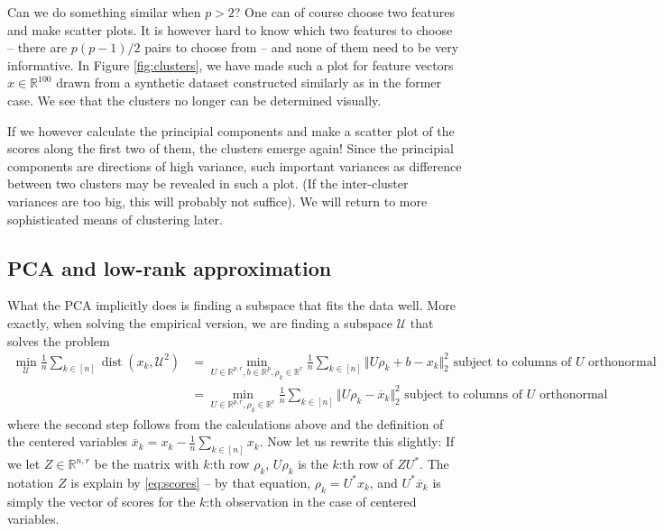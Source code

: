 \documentclass{article}
\newcommand{\calU}{\mathcal{U}}
\newcommand{\R}{\mathbb{R}}
\newcommand{\norm}[1]{\Vert #1 \Vert}
\DeclareMathOperator{\dist}{dist}
\begin{document}
Can we do something similar when $p>2$? One can of course choose two features and make scatter plots. It is however hard to know which two features to choose -- there are $p(p-1)/2$ pairs to choose from -- and none of them need to be very informative. In Figure \ref{fig:clusters}, we have made such a plot for feature vectors $x\in \R^{100}$ drawn from a synthetic dataset constructed similarly as in the former case. We see that the clusters no longer can be determined visually. 

If we however calculate the principial components and make a scatter plot of the scores along the first two of them, the clusters emerge again! Since the principial components are directions of high variance, such important variances as difference between two clusters may be revealed in such a plot. (If the inter-cluster variances are too big, this will probably not suffice). We will return to more sophisticated means of clustering later.

\subsection{PCA and low-rank approximation}
 What the PCA implicitly does is finding a subspace that fits the data well. More exactly, when solving the empirical version, we are finding a subspace $\calU$ that solves the problem
 \begin{align*}
     \min_{\calU} \frac{1}{n}\sum_{k \in [n]} \dist(x_k,\calU^2) &= \min_{U\in \R^{p,r},b \in \R^p,\rho_k \in \R^r} \frac{1}{n} \sum_{k \in [n]} \norm{U\rho_k+b-x_k}^2_2 \text{ subject to columns of } U \text{ orthonormal} \\
     &= \min_{U\in \R^{p,r},\rho_k\in \R^r} \frac{1}{n} \sum_{k \in [n]} \norm{U\rho_k- \overline{x}_k}^2_2 \text{ subject to columns of } U \text{ orthonormal}
 \end{align*}
 where the second step follows from the calculations above and the definition of the centered variables $\overline{x}_k = x_k - \tfrac{1}{n}\sum_{k\in [n]} x_k$. Now let us rewrite this slightly: If we let $Z \in \R^{n,r}$ be the matrix with $k$:th row $\rho_k$, $U\rho_k$ is the $k$:th row of $ZU^*$. The notation $Z$ is explain by \eqref{eq:scores} -- by that equation, $\rho_k=U^*{x}_k$, and $U^*\overline{x}_k$ is simply the vector of scores for the $k$:th observation in the case of centered variables.
 
\end{document}
